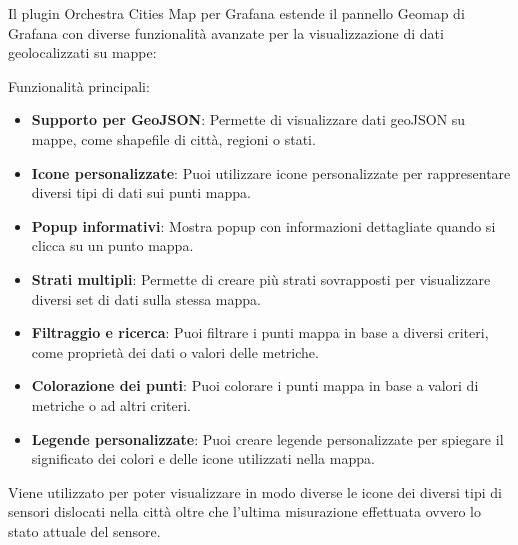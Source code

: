 Il plugin Orchestra Cities Map per Grafana estende il pannello Geomap di Grafana con diverse funzionalità avanzate per la visualizzazione di dati geolocalizzati su mappe:

Funzionalità principali:
\begin{itemize}
    \item \textbf{Supporto per GeoJSON}: Permette di visualizzare dati geoJSON su mappe, come shapefile di città, regioni o stati.
    \item \textbf{Icone personalizzate}: Puoi utilizzare icone personalizzate per rappresentare diversi tipi di dati sui punti mappa.
    \item \textbf{Popup informativi}: Mostra popup con informazioni dettagliate quando si clicca su un punto mappa.
    \item \textbf{Strati multipli}: Permette di creare più strati sovrapposti per visualizzare diversi set di dati sulla stessa mappa.
    \item \textbf{Filtraggio e ricerca}: Puoi filtrare i punti mappa in base a diversi criteri, come proprietà dei dati o valori delle metriche.
    \item \textbf{Colorazione dei punti}: Puoi colorare i punti mappa in base a valori di metriche o ad altri criteri.
    \item \textbf{Legende personalizzate}: Puoi creare legende personalizzate per spiegare il significato dei colori e delle icone utilizzati nella mappa.
\end{itemize}

Viene utilizzato per poter visualizzare in modo diverse le icone dei diversi tipi di sensori dislocati nella città oltre che l'ultima misurazione effettuata ovvero lo stato attuale del sensore.